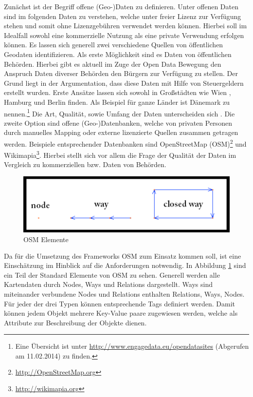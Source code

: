 Zunächst ist der Begriff offene (Geo-)Daten zu definieren.
Unter offenen Daten sind im folgenden Daten zu verstehen, welche unter freier Lizenz zur Verfügung stehen und somit ohne Lizenzgebühren verwendet werden können. Hierbei soll im Idealfall sowohl eine kommerzielle Nutzung als eine private Verwendung erfolgen können.
Es lassen sich generell zwei verschiedene Quellen von öffentlichen Geodaten identifizieren.
Als erste Möglichkeit sind es Daten von öffentlichen Behörden. Hierbei gibt es aktuell im Zuge der Open Data Bewegung \cite{Oreilly.2007} den Anspruch Daten diverser Behörden den Bürgern zur Verfügung zu stellen. Der Grund liegt in der Argumentation, dass diese Daten mit Hilfe von Steuergeldern erstellt wurden. Erste Ansätze lassen sich sowohl in Großstädten wie Wien \cite{Wien.2014}, Hamburg \cite{Hamburg.2014} und Berlin \cite{Berlin.2014} finden. Als Beispiel für ganze Länder ist Dänemark \cite{Denmark.2014} zu nennen.\footnote{Eine Übersicht ist unter \url{http://www.engagedata.eu/opendatasites} (Abgerufen am 11.02.2014) zu finden. } Die Art, Qualität, sowie Umfang der Daten unterscheiden sich . 
Die zweite Option sind offene (Geo-)Datenbanken, welche von privaten Personen durch manuelles Mapping oder externe lizenzierte Quellen zusammen getragen werden.
Beispiele entsprechender Datenbanken sind OpenStreetMap (OSM)\footnote{\url{http://OpenStreetMap.org}} und Wikimapia\footnote{\url{http://wikimapia.org}}.
Hierbei stellt sich vor allem die Frage der Qualität der Daten im Vergleich zu kommerziellen bzw. Daten von Behörden.

\begin{figure}[H]
\begin{center}
\includegraphics[width=120mm]{images/ch3_img03_OSM1.png}
\caption{OSM Elemente}
\label{img:ch03_img03_OSM1}
\end{center}
\end{figure}

Da für die Umsetzung des Frameworks OSM zum Einsatz kommen soll, ist eine Einschätzung im Hinblick auf die Anforderungen notwendig.
In Abbildung \ref{img:ch03_img03_OSM1} sind ein Teil der Standard Elemente von OSM zu sehen.
Generell werden alle Kartendaten durch Nodes, Ways und Relations dargestellt. Ways sind miteinander verbundene Nodes und Relations enthalten Relations, Ways, Nodes.
Für jeder der drei Typen können entsprechende Tags definiert werden. Damit können jedem Objekt mehrere Key-Value paare zugewiesen werden, welche als Attribute zur Beschreibung der Objekte dienen.

